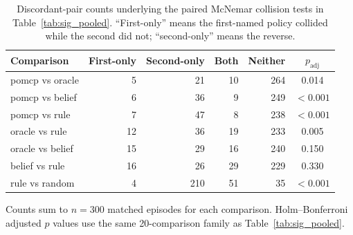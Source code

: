 \begin{table}[htbp]
\centering
\caption{Discordant-pair counts underlying the paired McNemar collision tests
  in Table~\ref{tab:sig_pooled}. ``First-only'' means the first-named policy
  collided while the second did not; ``second-only'' means the reverse.}
\label{tab:mcnemar_discordants}
\small
\begin{tabular}{lrrrrc}
\toprule
\textbf{Comparison} & \textbf{First-only} & \textbf{Second-only} &
\textbf{Both} & \textbf{Neither} & $p_\text{adj}$ \\
\midrule
pomcp vs oracle & 5 & 21 & 10 & 264 & 0.014 \\
pomcp vs belief & 6 & 36 & 9 & 249 & $<0.001$ \\
pomcp vs rule & 7 & 47 & 8 & 238 & $<0.001$ \\
oracle vs rule & 12 & 36 & 19 & 233 & 0.005 \\
oracle vs belief & 15 & 29 & 16 & 240 & 0.150 \\
belief vs rule & 16 & 26 & 29 & 229 & 0.330 \\
rule vs random & 4 & 210 & 51 & 35 & $<0.001$ \\
\bottomrule
\end{tabular}
\begin{tablenotes}
\small
\item Counts sum to $n{=}300$ matched episodes for each comparison.
  Holm--Bonferroni adjusted $p$ values use the same 20-comparison family as
  Table~\ref{tab:sig_pooled}.
\end{tablenotes}
\end{table}

